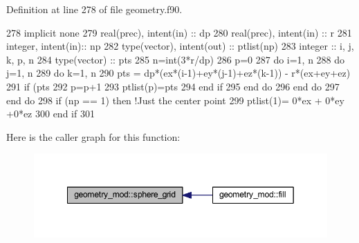 Definition at line 278 of file geometry.\+f90.


\begin{DoxyCode}
278     \textcolor{keywordtype}{implicit none}
279     \textcolor{keywordtype}{real(prec)}, \textcolor{keywordtype}{intent(in)} :: dp
280     \textcolor{keywordtype}{real(prec)}, \textcolor{keywordtype}{intent(in)} :: r
281     \textcolor{keywordtype}{integer}, \textcolor{keywordtype}{intent(in)}::  np
282     \textcolor{keywordtype}{type}(vector), \textcolor{keywordtype}{intent(out)} :: ptlist(np)
283     \textcolor{keywordtype}{integer} :: i, j, k, p, n
284     \textcolor{keywordtype}{type}(vector) :: pts
285     n=int(3*r/dp)
286     p=0
287     \textcolor{keywordflow}{do} i=1, n
288         \textcolor{keywordflow}{do} j=1, n
289             \textcolor{keywordflow}{do} k=1, n
290                 pts = dp*(ex*(i-1)+ey*(j-1)+ez*(k-1)) - r*(ex+ey+ez)
291                 \textcolor{keywordflow}{if} (pts%
292                     p=p+1
293                     ptlist(p)=pts
294 \textcolor{keywordflow}{                end if}
295 \textcolor{keywordflow}{            end do}
296 \textcolor{keywordflow}{        end do}
297 \textcolor{keywordflow}{    end do}
298     \textcolor{keywordflow}{if} (np == 1) \textcolor{keywordflow}{then} \textcolor{comment}{!Just the center point}
299         ptlist(1)= 0*ex + 0*ey +0*ez
300 \textcolor{keywordflow}{    end if}
301 
\end{DoxyCode}
Here is the caller graph for this function\+:\nopagebreak
\begin{figure}[H]
\begin{center}
\leavevmode
\includegraphics[width=349pt]{namespacegeometry__mod_a6c03a4ea3de6763940396dbeb3908ebc_icgraph}
\end{center}
\end{figure}
\mbox{\label{namespacegeometry__mod_a05de7940b4e7df5a2b31f3d0414e3743}} 
